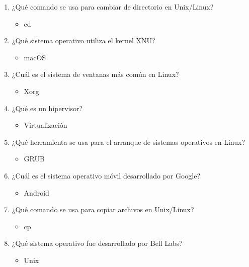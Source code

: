 \documentclass[11pt,twoside]{book}
\begin{document}
\begin{enumerate}[label=\textbf{\arabic*.}, leftmargin=2cm]
    \item ¿Qué comando se usa para cambiar de directorio en Unix/Linux? 
    \begin{itemize}
        \item cd
    \end{itemize}

    \item ¿Qué sistema operativo utiliza el kernel XNU? 
    \begin{itemize}
        \item macOS
    \end{itemize}

    \item ¿Cuál es el sistema de ventanas más común en Linux? 
    \begin{itemize}
        \item Xorg
    \end{itemize}

    \item ¿Qué es un hipervisor? 
    \begin{itemize}
        \item Virtualización
    \end{itemize}

    \item ¿Qué herramienta se usa para el arranque de sistemas operativos en Linux? 
    \begin{itemize}
        \item GRUB
    \end{itemize}

    \item ¿Cuál es el sistema operativo móvil desarrollado por Google? 
    \begin{itemize}
        \item Android
    \end{itemize}

    \item ¿Qué comando se usa para copiar archivos en Unix/Linux? 
    \begin{itemize}
        \item cp
    \end{itemize}

    \item ¿Qué sistema operativo fue desarrollado por Bell Labs? 
    \begin{itemize}
        \item Unix
    \end{itemize}

\end{enumerate}
\end{document}
